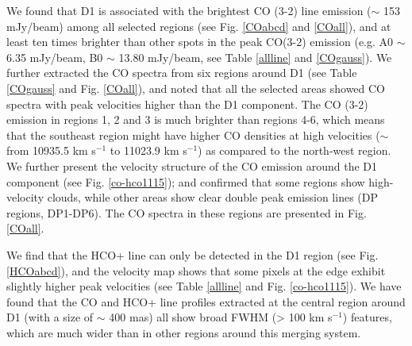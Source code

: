 \documentclass[]{aa} %
\newcommand{\kms}{km s$^{-1}$\xspace}
\begin{document}
We found that D1 is associated with the brightest CO (3-2) line emission ($\sim$ 153 mJy/beam) among all selected regions (see Fig. \ref{COabcd} and \ref{COall}), and at least ten times brighter than other spots in the peak CO(3-2) emission (e.g. A0 $\sim$ 6.35 mJy/beam, B0 $\sim$ 13.80 mJy/beam, see Table \ref{allline} and \ref{COgauss}). We further extracted the CO spectra from six regions around D1 (see Table \ref{COgauss} and Fig. \ref{COall}), and noted that all the selected areas showed CO spectra with peak velocities higher than the D1 component. The CO (3-2) emission in regions 1, 2 and 3 is much brighter than regions 4-6, which means that the southeast region might have higher CO densities at high velocities ($\sim$ from 10935.5 \kms to 11023.9 \kms)  as compared to the north-west region. We further present the velocity structure of the CO emission around the D1 component (see Fig. \ref{co-hco1115}); and confirmed that some regions show high-velocity clouds, while other areas show clear double peak emission lines (DP regions, DP1-DP6). The CO spectra in these regions are presented in Fig. \ref{COall}.

 We find that the HCO+ line can only be detected in the D1 region (see Fig. \ref{HCOabcd}), and the velocity map shows that some pixels at the edge exhibit slightly higher peak velocities (see Table \ref{allline} and Fig. \ref{co-hco1115}). %
We have found that the CO and HCO+ line profiles extracted at the central region around D1 (with a size of $\sim$ 400 mas) all show broad FWHM (> 100 \kms) features, which are much wider than in other regions around this merging system.
\end{document}
